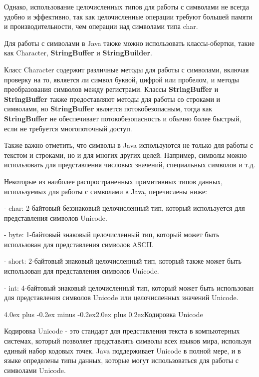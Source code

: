 \documentclass[12pt, a4paper]{book}%
\makeatletter
\renewcommand{\section}{\@startsection{section}{1}{1pt}%
{4.0ex plus -0.2ex minus -0.2ex}{2.0ex plus 0.2ex}{\centering\bf}}%
\makeatother
\begin{document}
{Однако, использование целочисленных типов для работы с символами не всегда удобно и эффективно, так как целочисленные операции требуют большей памяти и производительности, чем операции над символами типа char.

Для работы с символами в Java также можно использовать классы-обертки, такие как Character, {\bf StringBuffer} и {\bf StringBuilder}. 

Класс Character содержит различные методы для работы с символами, включая проверку на то, является ли символ буквой, цифрой или пробелом, и методы преобразования символов между регистрами. Классы {\bf StringBuffer} и {\bf StringBuffer} также предоставляют методы для работы со строками и символами, но {\bf StringBuffer} является потокобезопасным, тогда как {\bf StringBuffer} не обеспечивает потокобезопасность и обычно более быстрый, если не требуется многопоточный доступ.

Также важно отметить, что символы в Java используются не только для работы с текстом и строками, но и для многих других целей. Например, символы можно использовать для представления числовых значений, специальных символов и т.д.

Некоторые из наиболее распространенных примитивных типов данных, используемых для работы с символами в Java, перечислены ниже:

- char: 2-байтовый беззнаковый целочисленный тип, который используется для представления символов Unicode.

- byte: 1-байтовый знаковый целочисленный тип, который может быть использован для представления символов ASCII.

- short: 2-байтовый знаковый целочисленный тип, который также может быть использован для представления символов Unicode.

- int: 4-байтовый знаковый целочисленный тип, который может быть использован для представления символов Unicode или целочисленных значений Unicode.

\section{Кодировка Unicode}

Кодировка Unicode - это стандарт для представления текста в компьютерных системах, который позволяет представлять символы всех языков мира, используя единый набор кодовых точек. Java поддерживает Unicode в полной мере, и в языке определены типы данных, которые могут использоваться для работы с символами Unicode.

}
\end{document}

